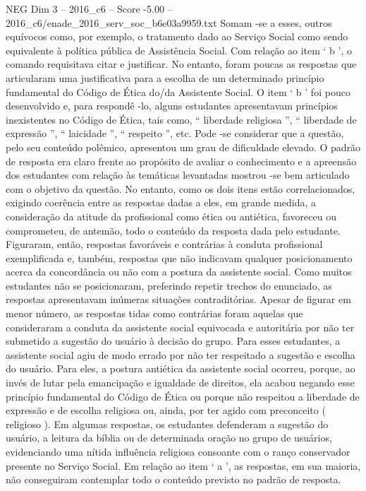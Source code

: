 \begin{textsample}{NEG Dim 3 – 2016\_c6 – Score -5.00 – 2016\_c6/enade\_2016\_serv\_soc\_b6e03a9959.txt}
Somam -se a esses, outros equívocos como, por exemplo, o tratamento dado ao Serviço Social como sendo equivalente à política pública de Assistência Social.
Com relação ao item ‘ b ’, o comando requisitava citar e justificar.
No entanto, foram poucas as respostas que articularam uma justificativa para a escolha de um determinado princípio fundamental do Código de Ética do/da Assistente Social.
O item ‘ b ’ foi pouco desenvolvido e, para respondê -lo, alguns estudantes apresentavam princípios inexistentes no Código de Ética, tais como, “ liberdade religiosa ”, “ liberdade de expressão ”, “ laicidade ”, “ respeito ”, etc.
Pode -se considerar que a questão, pelo seu conteúdo polêmico, apresentou um grau de dificuldade elevado.
O padrão de resposta era claro frente ao propósito de avaliar o conhecimento e a apreensão dos estudantes com relação às temáticas levantadas mostrou -se bem articulado com o objetivo da questão.
No entanto, como os dois itens estão correlacionados, exigindo coerência entre as respostas dadas a eles, em grande medida, a consideração da atitude da profissional como ética ou antiética, favoreceu ou comprometeu, de antemão, todo o conteúdo da resposta dada pelo estudante.
Figuraram, então, respostas favoráveis e contrárias à conduta profissional exemplificada e, também, respostas que não indicavam qualquer posicionamento acerca da concordância ou não com a postura da assistente social.
Como muitos estudantes não se posicionaram, preferindo repetir trechos do enunciado, as respostas apresentavam inúmeras situações contraditórias.
Apesar de figurar em menor número, as respostas tidas como contrárias foram aquelas que consideraram a conduta da assistente social equivocada e autoritária por não ter submetido a sugestão do usuário à decisão do grupo.
Para esses estudantes, a assistente social agiu de modo errado por não ter respeitado a sugestão e escolha do usuário.
Para eles, a postura antiética da assistente social ocorreu, porque, ao invés de lutar pela emancipação e igualdade de direitos, ela acabou negando esse princípio fundamental do Código de Ética ou porque não respeitou a liberdade de expressão e de escolha religiosa ou, ainda, por ter agido com preconceito ( religioso ).
Em algumas respostas, os estudantes defenderam a sugestão do usuário, a leitura da bíblia ou de determinada oração no grupo de usuários, evidenciando uma nítida influência religiosa consoante com o ranço conservador presente no Serviço Social.
Em relação ao item ‘ a ’, as respostas, em sua maioria, não conseguiram contemplar todo o conteúdo previsto no padrão de resposta.

\end{textsample}
